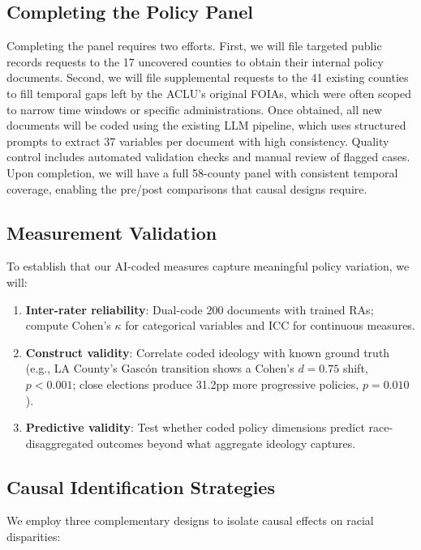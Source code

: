 \documentclass[12pt]{article}
\begin{document}
\subsection{Completing the Policy Panel}

Completing the panel requires two efforts. First, we will file targeted public records requests to the 17 uncovered counties to obtain their internal policy documents. Second, we will file supplemental requests to the 41 existing counties to fill temporal gaps left by the ACLU's original FOIAs, which were often scoped to narrow time windows or specific administrations. Once obtained, all new documents will be coded using the existing LLM pipeline, which uses structured prompts to extract 37 variables per document with high consistency. Quality control includes automated validation checks and manual review of flagged cases. Upon completion, we will have a full 58-county panel with consistent temporal coverage, enabling the pre/post comparisons that causal designs require.

\subsection{Measurement Validation}

To establish that our AI-coded measures capture meaningful policy variation, we will:

\begin{enumerate}
    \item \textbf{Inter-rater reliability}: Dual-code 200 documents with trained RAs; compute Cohen's $\kappa$ for categorical variables and ICC for continuous measures.
    \item \textbf{Construct validity}: Correlate coded ideology with known ground truth (e.g., LA County's Gasc\'{o}n transition shows a Cohen's $d = 0.75$ shift, $p < 0.001$; close elections produce 31.2pp more progressive policies, $p = 0.010$).
    \item \textbf{Predictive validity}: Test whether coded policy dimensions predict race-disaggregated outcomes beyond what aggregate ideology captures.
\end{enumerate}

\subsection{Causal Identification Strategies}

We employ three complementary designs to isolate causal effects on racial disparities:
\end{document}
